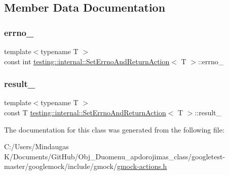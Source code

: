 \subsection{Member Data Documentation}
\mbox{\label{classtesting_1_1internal_1_1_set_errno_and_return_action_ac4f5ce108de323f1f76654c38aa883a3}} 
\subsubsection{\texorpdfstring{errno\_}{errno\_}}
{\footnotesize\ttfamily template$<$typename T $>$ \\
const int \mbox{\hyperlink{classtesting_1_1internal_1_1_set_errno_and_return_action}{testing\+::internal\+::\+Set\+Errno\+And\+Return\+Action}}$<$ T $>$\+::errno\+\_\+\hspace{0.3cm}{\ttfamily [private]}}

\mbox{\label{classtesting_1_1internal_1_1_set_errno_and_return_action_a271f5a3b41aa3a7f06fbd69ad19b1c77}} 
\subsubsection{\texorpdfstring{result\_}{result\_}}
{\footnotesize\ttfamily template$<$typename T $>$ \\
const T \mbox{\hyperlink{classtesting_1_1internal_1_1_set_errno_and_return_action}{testing\+::internal\+::\+Set\+Errno\+And\+Return\+Action}}$<$ T $>$\+::result\+\_\+\hspace{0.3cm}{\ttfamily [private]}}



The documentation for this class was generated from the following file\+:\begin{DoxyCompactItemize}
\item 
C\+:/\+Users/\+Mindaugas K/\+Documents/\+Git\+Hub/\+Obj\+\_\+\+Duomenu\+\_\+apdorojimas\+\_\+class/googletest-\/master/googlemock/include/gmock/\mbox{\hyperlink{googletest-master_2googlemock_2include_2gmock_2gmock-actions_8h}{gmock-\/actions.\+h}}\end{DoxyCompactItemize}
